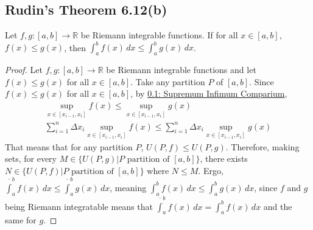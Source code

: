 \documentclass[11pt]{article}
\begin{document}
    \subsection{Rudin's Theorem 6.12(b)}
        \label{thm:5}
        Let $f,g: [a,b] \to \mathbb{R}$ be Riemann integrable functions.
        If for all $x \in [a,b]$, $f(x) \leq g(x)$, then $\int_{a}^{b} f(x)\,dx \leq \int_{a}^{b} g(x)\,dx$.
        \begin{proof}
            Let $f,g: [a,b] \to \mathbb{R}$ be Riemann integrable functions and let $f(x) \leq g(x)$ for all $x \in [a,b]$.
            Take any partition $P$ of $[a,b]$.
            Since $f(x) \leq g(x)$ for all $x \in [a,b]$, by \hyperref[thm:1]{0.1: Supremum Infimum Comparium}, 
            \begin{gather}
                \sup_{x \in [x_{i-1},x_i]} f(x) \leq \sup_{x \in [x_{i-1},x_i]} g(x)\\
                \sum_{i = 1}^{n} \Delta x_i \sup_{x \in [x_{i-1},x_i]} f(x) \leq \sum_{i = 1}^{n} \Delta x_i \sup_{x \in [x_{i-1},x_i]} g(x)
            \end{gather}
            That means that for any partition $P$, $U(P,f) \leq U(P,g)$.
            Therefore, making sets, for every $M \in \{U(P,g) | P \text{ partition of } [a,b]\}$, there exists $N \in \{U(P,f) | P \text{ partition of } [a,b]\}$ where $N \leq M$.
            Ergo, $\overline{\int}_{a}^{b} f(x)\,dx \leq \overline{\int}_{a}^{b} g(x)\,dx$, meaning $\int_{a}^{b} f(x)\,dx \leq \int_{a}^{b} g(x)\,dx$, since $f$ and $g$ being Riemann integratable means that $\overline{\int}_{a}^{b} f(x)\,dx = \int_{a}^{b} f(x)\,dx$ and the same for $g$.
        \end{proof}
\end{document}
